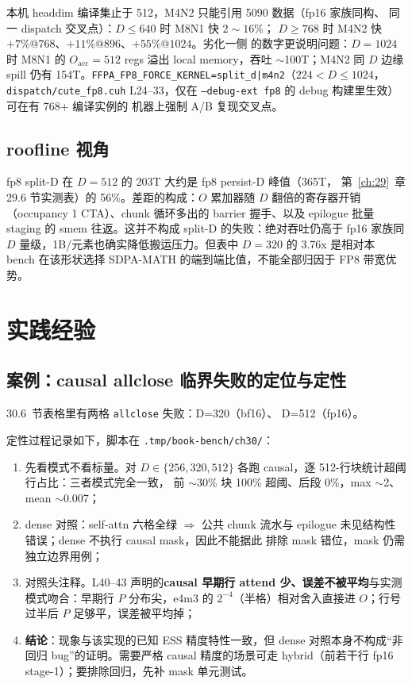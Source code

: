 本机 headdim 编译集止于 512，M4N2 只能引用 5090 数据（fp16 家族同构、
同一 dispatch 交叉点）：$D\le640$ 时 M8N1 快 $2\sim16\%$；
$D\ge768$ 时 M4N2 快 $+7\%@768$、$+11\%@896$、$+55\%@1024$。劣化一侧
的数字更说明问题：$D=1024$ 时 M8N1 的 $O_{\text{acc}}=512$ regs
溢出 local memory，吞吐 $\sim$100T；M4N2 同 $D$ 边缘 spill 仍有
154T。\texttt{FFPA\_FP8\_FORCE\_KERNEL=split\_d|m4n2}（$224<D\le1024$，
\texttt{dispatch/cute\_fp8.cuh} L24--33，仅在 \texttt{--debug-ext fp8}
的 debug 构建里生效）可在有 768+ 编译实例的
机器上强制 A/B 复现交叉点。

\subsection{roofline 视角}

fp8 split-D 在 $D=512$ 的 203T 大约是 fp8 persist-D 峰值（365T，
第~\ref{ch:29}~章 29.6 节实测表）的 56\%。差距的构成：$O$ 累加器随 $D$ 翻倍的寄存器开销
（occupancy 1 CTA）、chunk 循环多出的 barrier 握手、以及 epilogue
批量 staging 的 smem 往返。这并不构成 split-D 的失败：绝对吞吐仍高于
fp16 家族同 $D$ 量级，1B/元素也确实降低搬运压力。但表中 $D{=}320$ 的
3.76x 是相对本 bench 在该形状选择 SDPA-MATH 的端到端比值，不能全部归因于
FP8 带宽优势。

\section{实践经验}

\subsection{案例：causal allclose 临界失败的定位与定性}

30.6~节表格里有两格 \texttt{allclose} 失败：D=320（bf16）、
D=512（fp16）。

定性过程记录如下，脚本在 \texttt{.tmp/book-bench/ch30/}：

\begin{enumerate}[itemsep=0pt,topsep=2pt]
  \item 先看模式不看标量。对 $D\in\{256,320,512\}$ 各跑
        causal，逐 512-行块统计超阈行占比：三者模式完全一致，
        前 $\sim$30\% 块 100\% 超阈、后段 0\%，max $\sim$2、
        mean $\sim$0.007；
  \item dense 对照：self-attn 六格全绿 $\Rightarrow$ 公共 chunk 流水与
        epilogue 未见结构性错误；dense 不执行 causal mask，因此不能据此
        排除 mask 错位，mask 仍需独立边界用例；
  \item 对照头注释。L40--43 声明的\textbf{causal 早期行
        attend 少、误差不被平均}与实测模式吻合：早期行
        $P$ 分布尖，e4m3 的 $2^{-4}$（半格）相对舍入直接进 $O$；行号
        过半后 $P$ 足够平，误差被平均掉；
  \item \textbf{结论}：现象与该实现的已知 ESS 精度特性一致，但 dense
        对照本身不构成“非回归 bug”的证明。需要严格 causal 精度的场景可走
        hybrid（前若干行 fp16 stage-1）；要排除回归，先补 mask 单元测试。
\end{enumerate}


